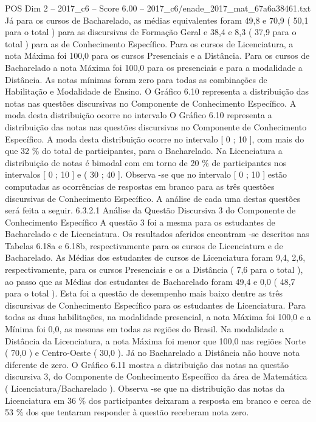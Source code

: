 \begin{textsample}{POS Dim 2 – 2017\_c6 – Score 6.00 – 2017\_c6/enade\_2017\_mat\_67a6a38461.txt}
Já para os cursos de Bacharelado, as médias equivalentes foram 49,8 e 70,9 ( 50,1 para o total ) para as discursivas de Formação Geral e 38,4 e 8,3 ( 37,9 para o total ) para as de Conhecimento Específico.
Para os cursos de Licenciatura, a nota Máxima foi 100,0 para os cursos Presenciais e a Distância.
Para os cursos de Bacharelado a nota Máxima foi 100,0 para os presenciais e para a modalidade a Distância.
As notas mínimas foram zero para todas as combinações de Habilitação e Modalidade de Ensino.
O Gráfico 6.10 representa a distribuição das notas nas questões discursivas no Componente de Conhecimento Específico.
A moda desta distribuição ocorre no intervalo O Gráfico 6.10 representa a distribuição das notas nas questões discursivas no Componente de Conhecimento Específico.
A moda desta distribuição ocorre no intervalo [ 0 ; 10 ], com mais do que 32 \% do total de participantes, para o Bacharelado.
Na Licenciatura a distribuição de notas é bimodal com em torno de 20 \% de participantes nos intervalos [ 0 ; 10 ] e ( 30 ; 40 ].
Observa -se que no intervalo [ 0 ; 10 ] estão computadas as ocorrências de respostas em branco para as três questões discursivas de Conhecimento Específico.
A análise de cada uma destas questões será feita a seguir. 6.3.2.1 Análise da Questão Discursiva 3 do Componente de Conhecimento Específico A questão 3 foi a mesma para os estudantes de Bacharelado e de Licenciatura.
Os resultados aferidos encontram -se descritos nas Tabelas 6.18a e 6.18b, respectivamente para os cursos de Licenciatura e de Bacharelado.
As Médias dos estudantes de cursos de Licenciatura foram 9,4, 2,6, respectivamente, para os cursos Presenciais e os a Distância ( 7,6 para o total ), ao passo que as Médias dos estudantes de Bacharelado foram 49,4 e 0,0 ( 48,7 para o total ).
Esta foi a questão de desempenho mais baixo dentre as três discursivas de Conhecimento Específico para os estudantes de Licenciatura.
Para todas as duas habilitações, na modalidade presencial, a nota Máxima foi 100,0 e a Mínima foi 0,0, as mesmas em todas as regiões do Brasil.
Na modalidade a Distância da Licenciatura, a nota Máxima foi menor que 100,0 nas regiões Norte ( 70,0 ) e Centro-Oeste ( 30,0 ).
Já no Bacharelado a Distância não houve nota diferente de zero.
O Gráfico 6.11 mostra a distribuição das notas na questão discursiva 3, do Componente de Conhecimento Específico da área de Matemática ( Licenciatura/Bacharelado ).
Observa -se que na distribuição das notas da Licenciatura em 36 \% dos participantes deixaram a resposta em branco e cerca de 53 \% dos que tentaram responder à questão receberam nota zero.

\end{textsample}
